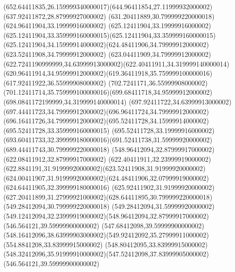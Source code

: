 {{	\curveto(652.64411835,26.159999340000017)(644.96411854,27.11999932000002)(637.92411872,28.87999927000002)
	\closepath
	\moveto(631.20411889,30.799999220000018)
	\lineto(624.96411904,33.19999916000002)
	\curveto(625.12411904,33.19999916000002)(625.12411904,33.359999160000015)(625.12411904,33.359999160000015)
	\curveto(625.12411904,34.15999914000002)(624.48411906,34.79999912000002)(623.52411908,34.79999912000002)
	\curveto(623.04411909,34.79999912000002)(622.7241190999999,34.63999913000002)(622.40411911,34.319999140000014)
	\curveto(620.96411914,34.95999912000002)(619.36411918,35.759999100000016)(617.92411922,36.55999908000002)
	\lineto(702.7241171,36.55999908000002)
	\curveto(701.12411714,35.759999100000016)(699.68411718,34.95999912000002)(698.0841172199999,34.319999140000014)
	\curveto(697.92411722,34.63999913000002)(697.44411723,34.79999912000002)(696.96411724,34.79999912000002)
	\curveto(696.16411726,34.79999912000002)(695.52411728,34.15999914000002)(695.52411728,33.359999160000015)
	\lineto(695.52411728,33.19999916000002)
	\curveto(693.60411733,32.399999180000016)(691.52411738,31.59999920000002)(689.44411743,30.799999220000018)
	\closepath
	\moveto(548.96412094,32.87999917000002)
	\lineto(622.08411912,32.87999917000002)
	\curveto(622.40411911,32.23999919000002)(622.8841191,31.91999920000002)(623.52411908,31.91999920000002)
	\curveto(624.00411907,31.91999920000002)(624.48411906,32.07999919000002)(624.64411905,32.399999180000016)
	\curveto(625.92411902,31.91999920000002)(627.20411899,31.27999921000002)(628.64411895,30.799999220000018)
	\lineto(549.28412094,30.799999220000018)
	\curveto(549.28412094,31.59999920000002)(549.12412094,32.23999919000002)(548.96412094,32.87999917000002)
	\closepath
	\moveto(546.564121,39.59999900000002)
	\lineto(547.68412098,39.59999900000002)
	\curveto(548.16412096,38.63999903000002)(549.92412092,35.27999911000002)(554.8841208,33.83999915000002)
	\lineto(548.80412095,33.83999915000002)
	\curveto(548.32412096,35.91999910000002)(547.52412098,37.83999905000002)(546.564121,39.59999900000002)
	\closepath
}
}
{
}
{
}
